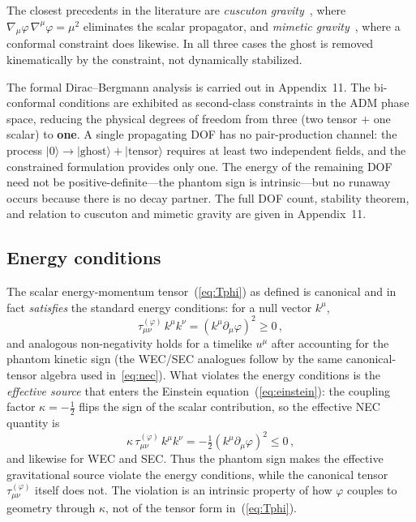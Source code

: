 \documentclass[aps,prd,onecolumn,superscriptaddress,nofootinbib,showpacs,12pt]{revtex4-2}
\begin{document}
The closest precedents in the literature are
\emph{cuscuton gravity}~\cite{Afshordi2007}, where
$\nabla_{\!\mu}\varphi\,\nabla^{\mu}\varphi = \mu^{2}$
eliminates the scalar propagator, and
\emph{mimetic gravity}~\cite{Chamseddine2013}, where a
conformal constraint does likewise.  In all three cases
the ghost is removed kinematically by the constraint,
not dynamically stabilized.

The formal Dirac--Bergmann analysis is carried out in
Appendix~11.  The bi-conformal conditions are exhibited
as second-class constraints in the ADM phase space,
reducing the physical degrees of freedom from three
(two tensor $+$ one scalar) to \textbf{one}.  A single
propagating DOF has no pair-production channel: the
process $|0\rangle\to|\text{ghost}\rangle+|\text{tensor}\rangle$
requires at least two independent fields, and the
constrained formulation provides only one.  The energy
of the remaining DOF need not be positive-definite---the
phantom sign is intrinsic---but no runaway occurs because
there is no decay partner.  The full DOF count, stability
theorem, and relation to cuscuton and mimetic gravity
are given in Appendix~11.

\subsection{Energy conditions}\label{sec:energy_conditions}

The scalar energy-momentum tensor~(\ref{eq:Tphi}) as
defined is canonical and in fact \emph{satisfies} the
standard energy conditions:  for a null vector $k^{\mu}$,
\begin{equation}\label{eq:nec}
  \tau_{\mu\nu}^{(\varphi)}\,k^{\mu}k^{\nu}
  = (k^{\mu}\partial_{\mu}\varphi)^{2} \geq 0\,,
\end{equation}
and analogous non-negativity holds for a timelike
$u^{\mu}$ after accounting for the phantom kinetic sign
(the WEC/SEC analogues follow by the same canonical-tensor
algebra used in~\eqref{eq:nec}).  What violates the
energy conditions is the \emph{effective source} that
enters the Einstein equation~(\ref{eq:einstein}): the
coupling factor $\kappa = -\frac12$ flips the sign of the
scalar contribution, so the effective NEC quantity is
\begin{equation}\label{eq:nec_effective}
  \kappa\,\tau_{\mu\nu}^{(\varphi)}\,k^{\mu}k^{\nu}
  = -\tfrac{1}{2}(k^{\mu}\partial_{\mu}\varphi)^{2}\leq 0\,,
\end{equation}
and likewise for WEC and SEC.  Thus the phantom sign
makes the effective gravitational source violate the
energy conditions, while the canonical tensor
$\tau_{\mu\nu}^{(\varphi)}$ itself does not.  The violation is
an intrinsic property of how $\varphi$ couples to geometry
through $\kappa$, not of the tensor form in~(\ref{eq:Tphi}).
\end{document}
